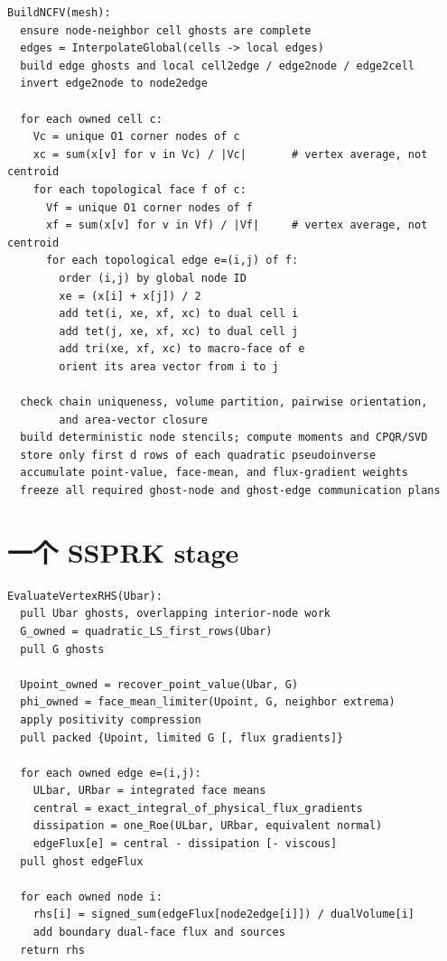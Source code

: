 \documentclass[UTF8,a4paper,11pt,openany]{ctexrep}
\numberwithin{equation}{chapter}
\begin{document}
\begin{lstlisting}[style=dnds]
BuildNCFV(mesh):
  ensure node-neighbor cell ghosts are complete
  edges = InterpolateGlobal(cells -> local edges)
  build edge ghosts and local cell2edge / edge2node / edge2cell
  invert edge2node to node2edge

  for each owned cell c:
    Vc = unique O1 corner nodes of c
    xc = sum(x[v] for v in Vc) / |Vc|       # vertex average, not centroid
    for each topological face f of c:
      Vf = unique O1 corner nodes of f
      xf = sum(x[v] for v in Vf) / |Vf|     # vertex average, not centroid
      for each topological edge e=(i,j) of f:
        order (i,j) by global node ID
        xe = (x[i] + x[j]) / 2
        add tet(i, xe, xf, xc) to dual cell i
        add tet(j, xe, xf, xc) to dual cell j
        add tri(xe, xf, xc) to macro-face of e
        orient its area vector from i to j

  check chain uniqueness, volume partition, pairwise orientation,
        and area-vector closure
  build deterministic node stencils; compute moments and CPQR/SVD
  store only first d rows of each quadratic pseudoinverse
  accumulate point-value, face-mean, and flux-gradient weights
  freeze all required ghost-node and ghost-edge communication plans
\end{lstlisting}

\section{一个 SSPRK stage}

\begin{lstlisting}[style=dnds]
EvaluateVertexRHS(Ubar):
  pull Ubar ghosts, overlapping interior-node work
  G_owned = quadratic_LS_first_rows(Ubar)
  pull G ghosts

  Upoint_owned = recover_point_value(Ubar, G)
  phi_owned = face_mean_limiter(Upoint, G, neighbor extrema)
  apply positivity compression
  pull packed {Upoint, limited G [, flux gradients]}

  for each owned edge e=(i,j):
    ULbar, URbar = integrated face means
    central = exact_integral_of_physical_flux_gradients
    dissipation = one_Roe(ULbar, URbar, equivalent normal)
    edgeFlux[e] = central - dissipation [- viscous]
  pull ghost edgeFlux

  for each owned node i:
    rhs[i] = signed_sum(edgeFlux[node2edge[i]]) / dualVolume[i]
    add boundary dual-face flux and sources
  return rhs
\end{lstlisting}
\end{document}
